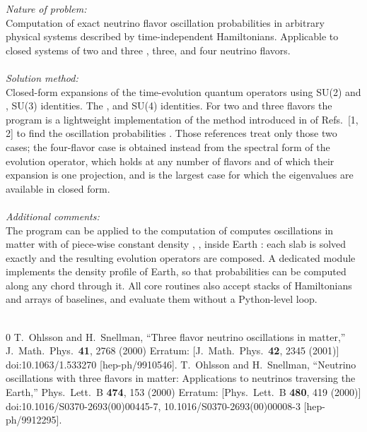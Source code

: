 \documentclass[final,5p,times,twocolumn]{elsarticle}
\newcommand{\eg}{{\it e.g.}}
\providecommand{\DIFaddtex}[1]{{\protect\color{blue} \sf #1}} %
\providecommand{\DIFdeltex}[1]{{\protect\color{red} \scriptsize #1}} %
\providecommand{\DIFaddbegin}{} %
\providecommand{\DIFaddend}{} %
\providecommand{\DIFdelbegin}{} %
\providecommand{\DIFdelend}{} %
\providecommand{\DIFadd}[1]{\DIFaddtex{#1}} %
\providecommand{\DIFdel}[1]{\DIFdeltex{#1}} %
\begin{document}
\begin{small}
\smallskip
{\em Nature of problem:} \\
Computation of exact neutrino flavor oscillation probabilities in arbitrary physical systems described by time-independent Hamiltonians.  Applicable to closed systems of two\DIFdelbegin \DIFdel{and three}\DIFdelend \DIFaddbegin \DIFadd{, three, and four }\DIFaddend neutrino flavors. \\ \\
\smallskip
{\em Solution method:}\\
Closed-form expansions of the time-evolution quantum operators using SU(2)\DIFdelbegin \DIFdel{and }\DIFdelend \DIFaddbegin \DIFadd{, }\DIFaddend SU(3)\DIFdelbegin \DIFdel{identities.  The }\DIFdelend \DIFaddbegin \DIFadd{, and SU(4) identities.  For two and three flavors the }\DIFaddend program is a lightweight implementation of the method \DIFdelbegin \DIFdel{introduced in }\DIFdelend \DIFaddbegin \DIFadd{of }\DIFaddend Refs.\ [1, 2]\DIFdelbegin \DIFdel{to find the oscillation probabilities}\DIFdelend \DIFaddbegin \DIFadd{.  Those references treat only those two cases; the four-flavor case is obtained instead from the spectral form of the evolution operator, which holds at any number of flavors and of which their expansion is one projection, and is the largest case for which the eigenvalues are available in closed form}\DIFaddend . \\ \\
\smallskip
{\em Additional comments:}\\
The program \DIFdelbegin \DIFdel{can be applied to the computation of }\DIFdelend \DIFaddbegin \DIFadd{computes }\DIFaddend oscillations in matter \DIFdelbegin \DIFdel{with }\DIFdelend \DIFaddbegin \DIFadd{of }\DIFaddend piece-wise constant density\DIFdelbegin \DIFdel{, }%
\DIFdel{, inside Earth}\DIFdelend \DIFaddbegin \DIFadd{: each slab is solved exactly and the resulting evolution operators are composed.  A dedicated module implements the density profile of Earth, so that probabilities can be computed along any chord through it.  All core routines also accept stacks of Hamiltonians and arrays of baselines, and evaluate them without a Python-level loop}\DIFaddend .   \\ \\

\medskip

\begin{thebibliography}{0}
  T.~Ohlsson and H.~Snellman,
  ``Three flavor neutrino oscillations in matter,''
  J.\ Math.\ Phys.\  {\bf 41}, 2768 (2000)
  Erratum: [J.\ Math.\ Phys.\  {\bf 42}, 2345 (2001)]
  doi:10.1063/1.533270
  [hep-ph/9910546].
  T.~Ohlsson and H.~Snellman,
  ``Neutrino oscillations with three flavors in matter: Applications to neutrinos traversing the Earth,''
  Phys.\ Lett.\ B {\bf 474}, 153 (2000)
  Erratum: [Phys.\ Lett.\ B {\bf 480}, 419 (2000)]
  doi:10.1016/S0370-2693(00)00445-7, 10.1016/S0370-2693(00)00008-3
  [hep-ph/9912295].
\end{thebibliography}


\end{small}
\end{document}

